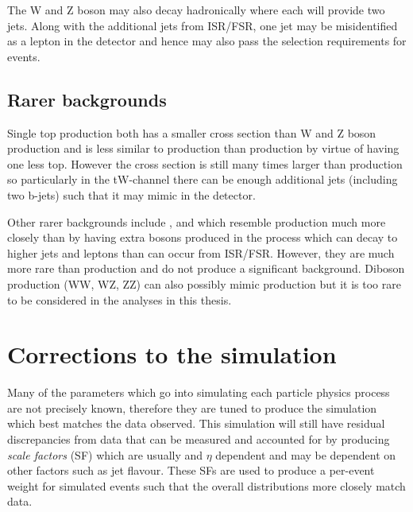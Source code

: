 The W and Z boson may also decay hadronically where each will provide two jets. Along with the additional jets from ISR/FSR, one jet may be misidentified as a lepton in the detector and hence may also pass the selection requirements for \tttt events.

\subsection{Rarer backgrounds}
Single top production both has a smaller cross section than W and Z boson production and is less similar to \tttt production than \ttbar production by virtue of having one less top. However the cross section is still many times larger than \tttt production so particularly in the tW-channel there can be enough additional jets (including two b-jets) such that it may mimic \tttt in the detector.


Other rarer backgrounds include \ttH, \ttZ and \ttW which resemble \tttt production much more closely than \ttbar by having extra bosons produced in the process which can decay to higher \pt jets and leptons than can occur from ISR/FSR. However, they are much more rare than \ttbar production and do not produce a significant background. Diboson production (WW, WZ, ZZ) can also possibly mimic \tttt production but it is too rare to be considered in the analyses in this thesis.


\section{Corrections to the simulation}
\label{sec:Calibrations}
Many of the parameters which go into simulating each particle physics process are not precisely known, therefore they are tuned to produce the simulation which best matches the data observed. This simulation will still have residual discrepancies from data that can be measured and accounted for by producing \emph{scale factors} (SF) which are usually \pt and $\eta$ dependent and may be dependent on other factors such as jet flavour. These SFs are used to produce a per-event weight for simulated events such that the overall distributions more closely match data. 


